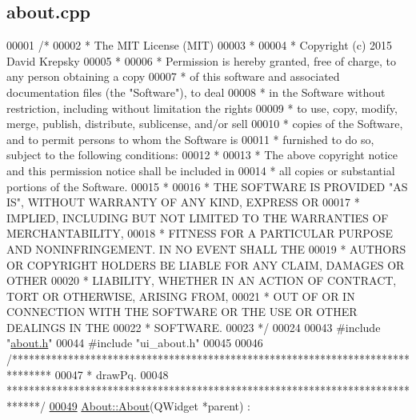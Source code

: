 \hypertarget{about_8cpp_source}{}\subsection{about.\+cpp}
\label{about_8cpp_source}

\begin{DoxyCode}
00001 \textcolor{comment}{/*}
00002 \textcolor{comment}{ * The MIT License (MIT)}
00003 \textcolor{comment}{ *}
00004 \textcolor{comment}{ * Copyright (c) 2015 David Krepsky}
00005 \textcolor{comment}{ *}
00006 \textcolor{comment}{ * Permission is hereby granted, free of charge, to any person obtaining a copy}
00007 \textcolor{comment}{ * of this software and associated documentation files (the "Software"), to deal}
00008 \textcolor{comment}{ * in the Software without restriction, including without limitation the rights}
00009 \textcolor{comment}{ * to use, copy, modify, merge, publish, distribute, sublicense, and/or sell}
00010 \textcolor{comment}{ * copies of the Software, and to permit persons to whom the Software is}
00011 \textcolor{comment}{ * furnished to do so, subject to the following conditions:}
00012 \textcolor{comment}{ *}
00013 \textcolor{comment}{ * The above copyright notice and this permission notice shall be included in}
00014 \textcolor{comment}{ * all copies or substantial portions of the Software.}
00015 \textcolor{comment}{ *}
00016 \textcolor{comment}{ * THE SOFTWARE IS PROVIDED "AS IS", WITHOUT WARRANTY OF ANY KIND, EXPRESS OR}
00017 \textcolor{comment}{ * IMPLIED, INCLUDING BUT NOT LIMITED TO THE WARRANTIES OF MERCHANTABILITY,}
00018 \textcolor{comment}{ * FITNESS FOR A PARTICULAR PURPOSE AND NONINFRINGEMENT. IN NO EVENT SHALL THE}
00019 \textcolor{comment}{ * AUTHORS OR COPYRIGHT HOLDERS BE LIABLE FOR ANY CLAIM, DAMAGES OR OTHER}
00020 \textcolor{comment}{ * LIABILITY, WHETHER IN AN ACTION OF CONTRACT, TORT OR OTHERWISE, ARISING FROM,}
00021 \textcolor{comment}{ * OUT OF OR IN CONNECTION WITH THE SOFTWARE OR THE USE OR OTHER DEALINGS IN THE}
00022 \textcolor{comment}{ * SOFTWARE.}
00023 \textcolor{comment}{ */}
00024 
00043 \textcolor{preprocessor}{#include "\hyperlink{about_8h}{about.h}"}
00044 \textcolor{preprocessor}{#include "ui\_about.h"}
00045 
00046 \textcolor{comment}{/*******************************************************************************}
00047 \textcolor{comment}{ * drawPq.}
00048 \textcolor{comment}{ ******************************************************************************/}
\hypertarget{about_8cpp_source_l00049}{}\hyperlink{group___window_gab79599ebbcdeffe0a96e00f010e64177}{00049} \hyperlink{group___window_gab79599ebbcdeffe0a96e00f010e64177}{About::About}(QWidget *parent) :

\end{DoxyCode}

